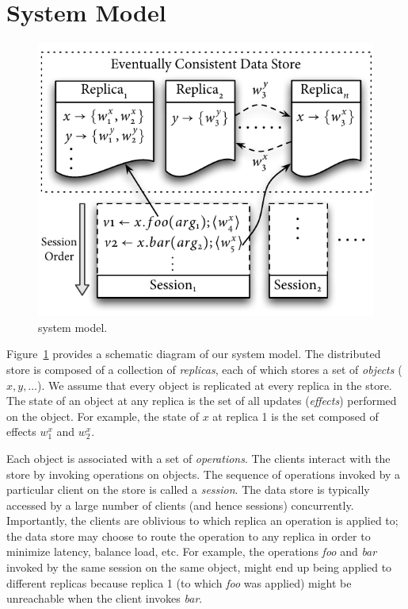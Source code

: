 \section{System Model}
\label{q_sec:sysmod}

\begin{figure}[h]
\centering
\includegraphics[width=0.65\columnwidth]{Figures/SystemModel}
\caption{\quelea system model.}
\label{fig:sysmod}
\end{figure}

Figure~\ref{fig:sysmod} provides a schematic diagram of our system model. The
distributed store is composed of a collection of \emph{replicas}, each of which
stores a set of \emph{objects} ($x,y,\ldots$). We assume that every object is
replicated at every replica in the store. The state of an object at any replica
is the set of all updates (\emph{effects}) performed on the object. For
example, the state of $x$ at replica 1 is the set composed of effects $w^x_1$
and $w^x_2$.

Each object is associated with a set of \emph{operations}. The clients interact
with the store by invoking operations on objects. The sequence of operations
invoked by a particular client on the store is called a \emph{session}. The
data store is typically accessed by a large number of clients (and hence
sessions) concurrently. Importantly, the clients are oblivious to which replica
an operation is applied to; the data store may choose to route the operation to
any replica in order to minimize latency, balance load, etc. For example, the
operations \emph{foo} and \emph{bar} invoked by the same session on the same
object, might end up being applied to different replicas because replica 1 (to
which \emph{foo} was applied) might be unreachable when the client invokes
\emph{bar}.

